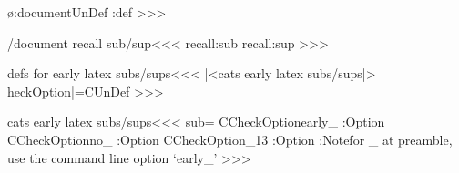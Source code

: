 {{{{{{{{%
\ifx \o:document\:UnDef
   \pend:def
\fi
>>>

\</document recall sub/sup\><<<
\csname recall:sub\endcsname   
\csname recall:sup\endcsname
>>>

\<defs for early latex subs/sups\><<<
\def\:CheckOption#1{\def\:temp{#1}%
   \:Optionfalse
   \expandafter\:ScanOptions\config:opt,,//}
\def\:ScanOptions#1,#2//{\def\:next{#1}%
   \ifx        \:next\empty
   \else \ifx  \:temp\:next   \:Optiontrue   \let\:next\relax
   \else \def\:next{\:ScanOptions#2//}%
   \fi  \fi  \:next }
|<cats early latex subs/sups|>
\let\:CheckOption|=\:UnDef
>>>



\<cats early latex subs/sups\><<<
\let\early:sub=\empty
\:CheckOption{early_} \if:Option
   \:CheckOption{no_} \if:Option  \else
      \:CheckOption{_13} \if:Option
           \def\early:sub{%
               \xdef\recall:sub{%
                  \mathcode`\noexpand\_=\the\mathcode`\_
                  \catcode`\noexpand\_=\the\catcode`\_
               }
              \mathcode`\_="8000 \catcode`\_=13 
          }
      \else
           \def\early:sub{%
               \xdef\recall:sub{%
                  \mathcode`\noexpand\_=\the\mathcode`\_
                  \catcode`\noexpand\_=\the\catcode`\_
               }%
              \mathcode`\_="8000 \catcode`\_=12 
          }
      \fi
   \fi
\else 
   \Log:Note{for \string_ at preamble, 
          use the command line option `early\string_'}%
\fi
>>>

}}}}}}}}
